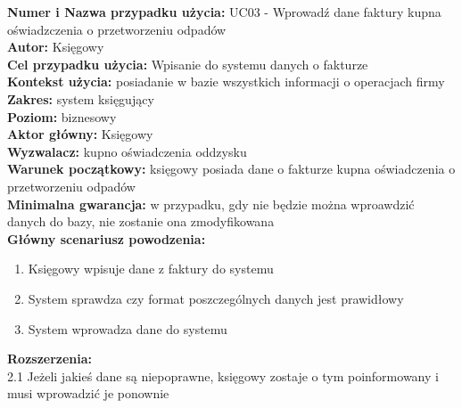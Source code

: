 \textbf{Numer i Nazwa przypadku użycia:} UC03 - Wprowadź dane faktury kupna oświadzczenia o przetworzeniu odpadów \\
\textbf{Autor:} Księgowy\\
\textbf{Cel przypadku użycia:} Wpisanie do systemu danych o fakturze \\
\textbf{Kontekst użycia:} posiadanie w bazie wszystkich informacji o operacjach firmy\\
\textbf{Zakres:} system księgujący \\
\textbf{Poziom:} biznesowy \\
\textbf{Aktor główny:} Księgowy \\
\textbf{Wyzwalacz:} kupno oświadczenia oddzysku \\
\textbf{Warunek początkowy:} księgowy posiada dane o fakturze kupna oświadczenia o przetworzeniu odpadów \\
\textbf{Minimalna gwarancja:} w przypadku, gdy nie będzie można wproawdzić danych do bazy, nie zostanie ona zmodyfikowana \\
\textbf{Główny scenariusz powodzenia:} 
	\begin{enumerate}
		\item Księgowy wpisuje dane z faktury do systemu
		\item System sprawdza czy format poszczególnych danych jest prawidłowy
		\item System wprowadza dane do systemu
	\end{enumerate}
\textbf{Rozszerzenia:} \\
2.1 Jeżeli jakieś dane są niepoprawne, księgowy zostaje o tym poinformowany i musi wprowadzić je ponownie

